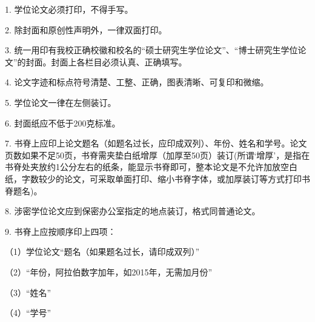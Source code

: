 1. 学位论文必须打印，不得手写。

2. 除封面和原创性声明外，一律双面打印。

3. 统一用印有我校正确校徽和校名的“硕士研究生学位论文”、“博士研究生学位论文”的封面。封面上各栏目必须认真、正确填写。

4. 论文字迹和标点符号清楚、工整、正确，图表清晰、可复印和微缩。

5. 学位论文一律在左侧装订。

6. 封面纸应不低于200克标准。

7. 书脊上应印上论文题名（如题名过长，应印成双列）、年份、姓名和学号。论文页数如果不足50页，书脊需夹垫白纸增厚（加厚至50页）装订(所谓‘增厚’，是指在书脊处夹放约1公分左右的纸条，能显示书脊即可，整本论文是不允许加放空白纸，字数较少的论文，可采取单面打印、缩小书脊字体，或加厚装订等方式打印书脊题名)。

8. 涉密学位论文应到保密办公室指定的地点装订，格式同普通论文。


9. 书脊上应按顺序印上四项：

（1）学位论文“题名（如果题名过长，请印成双列）”

（2）“年份，阿拉伯数字加年，如2015年，无需加月份”

（3）“姓名”

（4）“学号”


